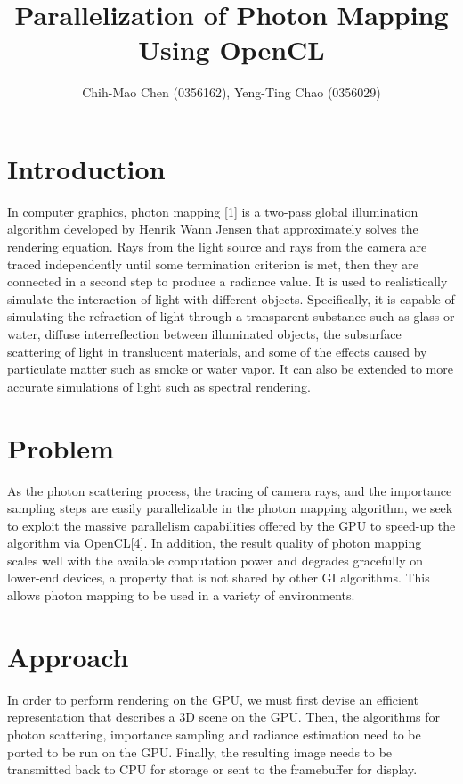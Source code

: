\documentclass{acm_proc_article-sp}
\begin{document}
\title{Parallelization of Photon Mapping Using OpenCL}
\subtitle{Chih-Mao Chen (0356162), Yeng-Ting Chao (0356029)}

\maketitle

\section{Introduction}
In computer graphics, photon mapping [1] is a two-pass global illumination algorithm developed by Henrik Wann Jensen that approximately solves the rendering equation. Rays from the light source and rays from the camera are traced independently until some termination criterion is met, then they are connected in a second step to produce a radiance value. It is used to realistically simulate the interaction of light with different objects. Specifically, it is capable of simulating the refraction of light through a transparent substance such as glass or water, diffuse interreflection between illuminated objects, the subsurface scattering of light in translucent materials, and some of the effects caused by particulate matter such as smoke or water vapor. It can also be extended to more accurate simulations of light such as spectral rendering.
\section{Problem}
As the photon scattering process, the tracing of camera rays, and the importance sampling steps are easily parallelizable in the photon mapping algorithm, we seek to exploit the massive parallelism capabilities offered by the GPU to speed-up the algorithm via OpenCL[4]. In addition, the result quality of photon mapping scales well with the available computation power and degrades gracefully on lower-end devices, a property that is not shared by other GI algorithms. This allows photon mapping to be used in a variety of environments.
\section{Approach}
In order to perform rendering on the GPU, we must first devise an efficient representation that describes a 3D scene on the GPU. Then, the algorithms for photon scattering, importance sampling and radiance estimation need to be ported to be run on the GPU. Finally, the resulting image needs to be transmitted back to CPU for storage or sent to the framebuffer for display.
\end{document}
